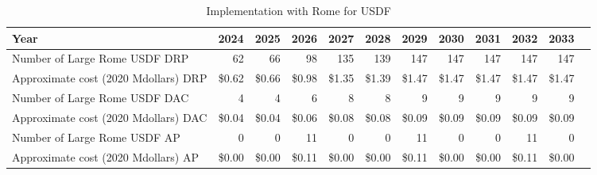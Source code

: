 \tiny \begin{longtable} { |p{}  |r  |r  |r  |r  |r  |r  |r  |r  |r  |r  |r |} 
\caption{Implementation with Rome for USDF \label{tab:opsRomeUSDF}}\\ 
\hline 
\textbf{Year}&\textbf{2024}&\textbf{2025}&\textbf{2026}&\textbf{2027}&\textbf{2028}&\textbf{2029}&\textbf{2030}&\textbf{2031}&\textbf{2032}&\textbf{2033} \\ \hline
{Number of Large Rome USDF DRP}&{62}&{66}&{98}&{135}&{139}&{147}&{147}&{147}&{147}&{147} \\ \hline
{Approximate cost (2020 Mdollars) DRP}&{\$0.62}&{\$0.66}&{\$0.98}&{\$1.35}&{\$1.39}&{\$1.47}&{\$1.47}&{\$1.47}&{\$1.47}&{\$1.47} \\ \hline
{Number of Large Rome USDF DAC}&{4}&{4}&{6}&{8}&{8}&{9}&{9}&{9}&{9}&{9} \\ \hline
{Approximate cost (2020 Mdollars) DAC}&{\$0.04}&{\$0.04}&{\$0.06}&{\$0.08}&{\$0.08}&{\$0.09}&{\$0.09}&{\$0.09}&{\$0.09}&{\$0.09} \\ \hline
{Number of Large Rome USDF AP}&{0}&{0}&{11}&{0}&{0}&{11}&{0}&{0}&{11}&{0} \\ \hline
{Approximate cost (2020 Mdollars) AP}&{\$0.00}&{\$0.00}&{\$0.11}&{\$0.00}&{\$0.00}&{\$0.11}&{\$0.00}&{\$0.00}&{\$0.11}&{\$0.00} \\ \hline
\end{longtable} \normalsize
